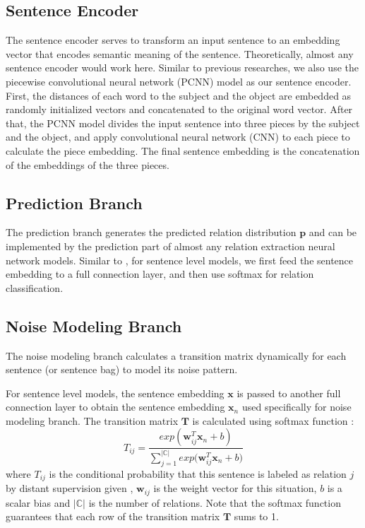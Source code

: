 \subsection{Sentence Encoder}
The sentence encoder serves to transform an input sentence to an embedding vector that encodes semantic meaning of the sentence. Theoretically, almost any sentence encoder would work here. Similar to previous researches, we also use the piecewise convolutional neural network (PCNN) model \cite{zeng2015distant} as our sentence encoder. First, the distances of each word to the subject and the object are embedded as randomly initialized vectors and concatenated to the original word vector. After that, the PCNN model divides the input sentence into three pieces by the subject and the object, and apply convolutional neural network (CNN) to each piece to calculate the piece embedding. The final sentence embedding is the concatenation of the embeddings of the three pieces.

\subsection{Prediction Branch}
The prediction branch generates the predicted relation distribution $\mathbf{p}$ and can be implemented by the prediction part of almost any relation extraction neural network models. Similar to \cite{luo2016temporal}, for sentence level models, we first feed the sentence embedding to a full connection layer, and then use softmax for relation classification. 

\subsection{Noise Modeling Branch}
The noise modeling branch calculates a transition matrix dynamically for each sentence (or sentence bag) to model its noise pattern.

For sentence level models, the sentence embedding $\mathbf{x}$ is passed to another full connection layer to obtain the sentence embedding $\mathbf{x}_n$ used specifically for noise modeling branch. The transition matrix $\mathbf{T}$ is calculated using softmax function :
\begin{equation}
T_{ij} = \frac{exp({\mathbf{w}_{ij}^T \mathbf{x}_n + b})}{\sum_{j=1}^{|\mathbb{C}|}{exp({\mathbf{w}_{ij}^T \mathbf{x}_n + b}})}
\end{equation}
where $T_{ij}$ is the conditional probability that this sentence is labeled as relation $j$ by distant supervision given , $\mathbf{w}_{ij}$ is the weight vector for this situation, $b$ is a scalar bias and $|\mathbb{C}|$ is the number of relations. Note that the softmax function guarantees that each row of the transition matrix $\mathbf{T}$ sums to 1. 

